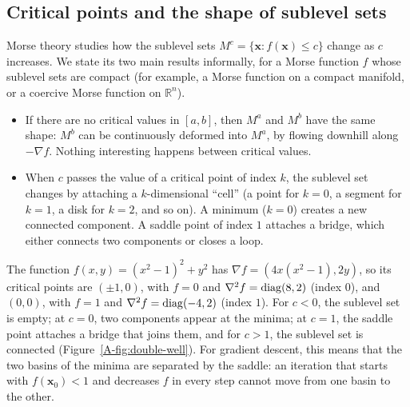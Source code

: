 \subsection{Critical points and the shape of sublevel sets}

Morse theory studies how the sublevel sets $M^c = \{\mathbf{x} : f(\mathbf{x}) \leq c\}$ change as $c$ increases. We state its two main results informally, for a Morse function $f$ whose sublevel sets are compact (for example, a Morse function on a compact manifold, or a coercive Morse function on $\mathbb{R}^n$).
\begin{itemize}
    \item If there are no critical values in $[a, b]$, then $M^a$ and $M^b$ have the same shape: $M^b$ can be continuously deformed into $M^a$, by flowing downhill along $-\nabla f$. Nothing interesting happens between critical values.
    \item When $c$ passes the value of a critical point of index $k$, the sublevel set changes by attaching a $k$-dimensional ``cell'' (a point for $k = 0$, a segment for $k = 1$, a disk for $k = 2$, and so on). A minimum ($k = 0$) creates a new connected component. A saddle point of index $1$ attaches a bridge, which either connects two components or closes a loop.
\end{itemize}

\begin{example}\label{A-ex:double-well}
    The function $f(x, y) = (x^2 - 1)^2 + y^2$ has $\nabla f = (4x(x^2 - 1), 2y)$, so its critical points are $(\pm 1, 0)$, with $f = 0$ and $\nabla^2 f = \operatorname{diag}(8, 2)$ (index $0$), and $(0, 0)$, with $f = 1$ and $\nabla^2 f = \operatorname{diag}(-4, 2)$ (index $1$). For $c < 0$, the sublevel set is empty; at $c = 0$, two components appear at the minima; at $c = 1$, the saddle point attaches a bridge that joins them, and for $c > 1$, the sublevel set is connected (Figure~\ref{A-fig:double-well}). For gradient descent, this means that the two basins of the minima are separated by the saddle: an iteration that starts with $f(\mathbf{x}_0) < 1$ and decreases $f$ in every step cannot move from one basin to the other.
\end{example}

